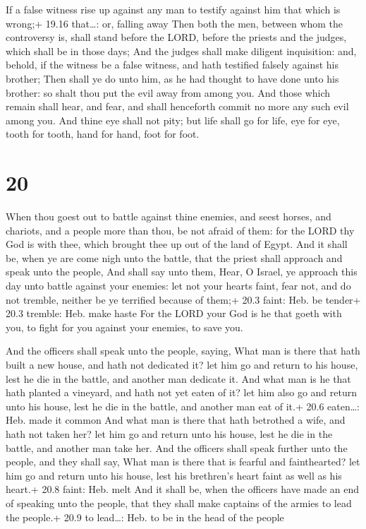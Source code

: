  If a false witness rise up against any man to testify
against him that which is wrong;+ 19.16 that\ldots: or, falling away
 Then both the men, between whom the controversy is, shall
stand before the LORD, before the priests and the judges, which shall be
in those days;  And the judges shall make diligent
inquisition: and, behold, if the witness be a false witness, and hath
testified falsely against his brother;  Then shall ye do
unto him, as he had thought to have done unto his brother: so shalt thou
put the evil away from among you.  And those which remain
shall hear, and fear, and shall henceforth commit no more any such evil
among you.  And thine eye shall not pity; but life shall go
for life, eye for eye, tooth for tooth, hand for hand, foot for foot.

\hypertarget{section-19}{%
\section{20}\label{section-19}}

 When thou goest out to battle against thine enemies, and
seest horses, and chariots, and a people more than thou, be not afraid
of them: for the LORD thy God is with thee, which brought thee up out of
the land of Egypt.  And it shall be, when ye are come nigh
unto the battle, that the priest shall approach and speak unto the
people,  And shall say unto them, Hear, O Israel, ye
approach this day unto battle against your enemies: let not your hearts
faint, fear not, and do not tremble, neither be ye terrified because of
them;+ 20.3 faint: Heb. be tender+ 20.3 tremble: Heb. make haste
 For the LORD your God is he that goeth with you, to fight
for you against your enemies, to save you.

 And the officers shall speak unto the people, saying,
What man is there that hath built a new house, and hath not dedicated
it? let him go and return to his house, lest he die in the battle, and
another man dedicate it.  And what man is he that hath
planted a vineyard, and hath not yet eaten of it? let him also go and
return unto his house, lest he die in the battle, and another man eat of
it.+ 20.6 eaten\ldots: Heb. made it common  And what man is
there that hath betrothed a wife, and hath not taken her? let him go and
return unto his house, lest he die in the battle, and another man take
her.  And the officers shall speak further unto the people,
and they shall say, What man is there that is fearful and fainthearted?
let him go and return unto his house, lest his brethren's heart faint as
well as his heart.+ 20.8 faint: Heb. melt  And it shall be,
when the officers have made an end of speaking unto the people, that
they shall make captains of the armies to lead the people.+ 20.9 to
lead\ldots: Heb. to be in the head of the people

